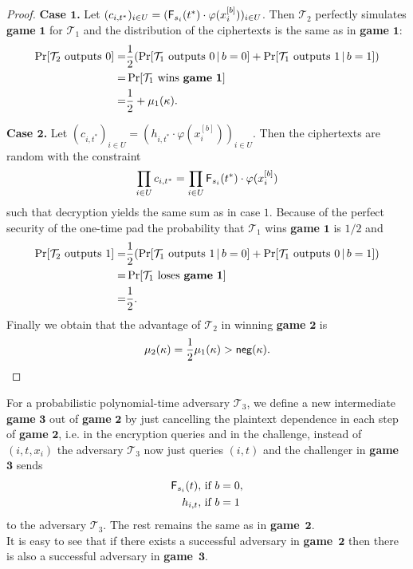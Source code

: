 \documentclass[10pt]{extarticle}
\begin{document}
\begin{proof}
\noindent\textbf{Case $\boldsymbol 1$.} Let $(c_{i,t^*})_{i\in U}=(\text{\upshape\sffamily F}_{s_i}(t^*)\cdot \varphi(x_i^{[b]}))_{i\in U}$. Then $\mathcal{T}_2$ perfectly simulates \textbf{game} $\boldsymbol 1$ for $\mathcal{T}_1$ and the distribution of the ciphertexts is the same as in \textbf{game} $\boldsymbol 1$:
\begin{align*} \Pr[\mathcal{T}_2 \text{ outputs } 0] = & \frac{1}{2}(\Pr[\mathcal{T}_1 \text{ outputs } 0 \,|\, b=0]+\Pr[\mathcal{T}_1 \text{ outputs } 1 \,|\, b=1])\\
 = & \Pr[\mathcal{T}_1 \text{ wins \textbf{game} } \boldsymbol 1]\\
 = & \frac{1}{2} + \mu_{1}(\kappa).
\end{align*}\par\medskip

\noindent \textbf{Case $\boldsymbol 2$.} Let $(c_{i,t^*})_{i\in U}=(h_{i,t^*}\cdot \varphi(x_i^{[b]}))_{i\in U}$. Then the ciphertexts are random with the constraint 
\[\prod_{i\in U}c_{i,t^*} =\prod_{i\in U}\text{\upshape\sffamily F}_{s_i}(t^*)\cdot \varphi(x_i^{[b]})\]
such that decryption yields the same sum as in case $1$.
Because of the perfect security of the one-time pad the probability that $\mathcal{T}_1$ wins \textbf{game} $\boldsymbol 1$ is $1/2$ and
\begin{align*} \Pr[\mathcal{T}_2 \text{ outputs } 1]= & \frac{1}{2}(\Pr[\mathcal{T}_1 \text{ outputs } 1 \,|\, b=0]+\Pr[\mathcal{T}_1 \text{ outputs } 0 \,|\, b=1])\\
 = & \Pr[\mathcal{T}_1 \text{ loses \textbf{game} } \boldsymbol 1]\\
 = & \frac{1}{2}.
\end{align*}
Finally we obtain that the advantage of $\mathcal{T}_2$ in winning \textbf{game} $\boldsymbol 2$ is
\[\mu_{2}(\kappa)=\frac{1}{2}\mu_{1}(\kappa)>\text{\upshape\sffamily neg}(\kappa).\]
\end{proof}

\noindent For a probabilistic polynomial-time adversary $\mathcal{T}_3$, we define a new intermediate \textbf{game} $\boldsymbol 3$ out of \textbf{game} $\boldsymbol 2$ by just cancelling the plaintext dependence in each step of \textbf{game} $\boldsymbol 2$, i.e. in the encryption queries and in the challenge, instead of $(i,t,x_i)$ the adversary $\mathcal{T}_3$ now just queries $(i,t)$ and the challenger in \textbf{game} $\boldsymbol 3$ sends
\begin{align*} \text{\upshape\sffamily F}_{s_i}(t), & \mbox{ if } b=0,\\
h_{i,t}, & \mbox{ if } b=1
\end{align*}
to the adversary $\mathcal{T}_3$. The rest remains the same as in \textbf{game}~$\boldsymbol 2$.\\
It is easy to see that if there exists a successful adversary in \textbf{game}~$\boldsymbol 2$ then there is also a successful adversary in \textbf{game}~$\boldsymbol 3$.
\end{document}
